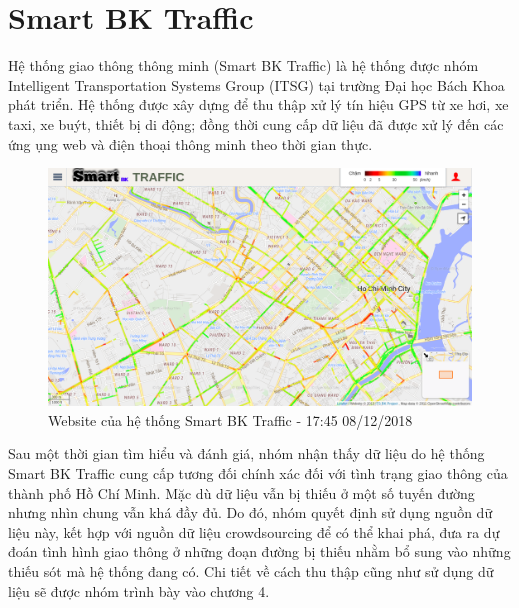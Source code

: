 \section{Smart BK Traffic}
Hệ thống giao thông thông minh (Smart BK Traffic) là hệ thống được nhóm Intelligent Transportation Systems Group (ITSG) tại trường Đại học Bách Khoa phát triển. Hệ thống được xây dựng để thu thập xử lý tín hiệu GPS từ xe hơi, xe taxi, xe buýt, thiết bị di động; đồng thời cung cấp dữ liệu đã được xử lý đến các ứng ụng web và điện thoại thông minh theo thời gian thực.

\begin{figure}[!ht]
	\begin{center}
		\includegraphics[width=1.0\textwidth]{images/smartbktraffic.png}
	\end{center}
	\caption{Website của hệ thống Smart BK Traffic - 17:45 08/12/2018}
\end{figure}

Sau một thời gian tìm hiểu và đánh giá, nhóm nhận thấy dữ liệu do hệ thống Smart BK Traffic cung cấp tương đối chính xác đối với tình trạng giao thông của thành phố Hồ Chí Minh. Mặc dù dữ liệu vẫn bị thiếu ở một số tuyến đường nhưng nhìn chung vẫn khá đầy đủ. Do đó, nhóm quyết định sử dụng nguồn dữ liệu này, kết hợp với nguồn dữ liệu crowdsourcing để có thể khai phá, đưa ra dự đoán tình hình giao thông ở những đoạn đường bị thiếu nhằm bổ sung vào những thiếu sót mà hệ thống đang có. Chi tiết về cách thu thập cũng như sử dụng dữ liệu sẽ được nhóm trình bày vào chương 4.
